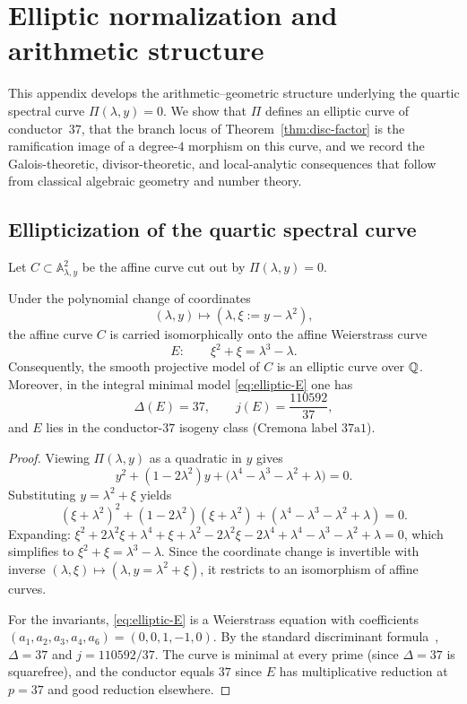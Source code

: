 \section{Elliptic normalization and arithmetic structure}\label{app:elliptic}

This appendix develops the arithmetic--geometric structure underlying the quartic spectral curve $\Pi(\lambda,y)=0$.
We show that $\Pi$ defines an elliptic curve of conductor~$37$, that the branch locus of Theorem~\ref{thm:disc-factor} is the ramification image of a degree-$4$ morphism on this curve, and we record the Galois-theoretic, divisor-theoretic, and local-analytic consequences that follow from classical algebraic geometry and number theory.

\subsection{Ellipticization of the quartic spectral curve}

Let $C\subset \mathbb{A}^2_{\lambda,y}$ be the affine curve cut out by $\Pi(\lambda,y)=0$.

\begin{theorem}[Ellipticization]\label{thm:ellipticization}
Under the polynomial change of coordinates
\[
(\lambda,y)\longmapsto (\lambda,\xi:=y-\lambda^2),
\]
the affine curve $C$ is carried isomorphically onto the affine Weierstrass curve
\begin{equation}\label{eq:elliptic-E}
E:\qquad \xi^2+\xi=\lambda^3-\lambda.
\end{equation}
Consequently, the smooth projective model of $C$ is an elliptic curve over $\mathbb{Q}$.
Moreover, in the integral minimal model \eqref{eq:elliptic-E} one has
\[
\Delta(E)=37,\qquad j(E)=\frac{110592}{37},
\]
and $E$ lies in the conductor-$37$ isogeny class (Cremona label $37\mathrm{a}1$).
\end{theorem}

\begin{proof}
Viewing $\Pi(\lambda,y)$ as a quadratic in $y$ gives
\[
y^2+(1-2\lambda^2)y+\bigl(\lambda^4-\lambda^3-\lambda^2+\lambda\bigr)=0.
\]
Substituting $y=\lambda^2+\xi$ yields
\[
(\xi+\lambda^2)^2+(1-2\lambda^2)(\xi+\lambda^2)+(\lambda^4-\lambda^3-\lambda^2+\lambda)=0.
\]
Expanding: $\xi^2+2\lambda^2\xi+\lambda^4+\xi+\lambda^2-2\lambda^2\xi-2\lambda^4+\lambda^4-\lambda^3-\lambda^2+\lambda=0$, which simplifies to $\xi^2+\xi=\lambda^3-\lambda$.
Since the coordinate change is invertible with inverse $(\lambda,\xi)\mapsto(\lambda,y=\lambda^2+\xi)$,
it restricts to an isomorphism of affine curves.

For the invariants, \eqref{eq:elliptic-E} is a Weierstrass equation with coefficients
$(a_1,a_2,a_3,a_4,a_6)=(0,0,1,-1,0)$.
By the standard discriminant formula~\cite{Silverman2009}, $\Delta=37$ and $j=110592/37$.
The curve is minimal at every prime (since $\Delta=37$ is squarefree), and the conductor equals $37$ since $E$ has multiplicative reduction at $p=37$ and good reduction elsewhere.
\end{proof}

